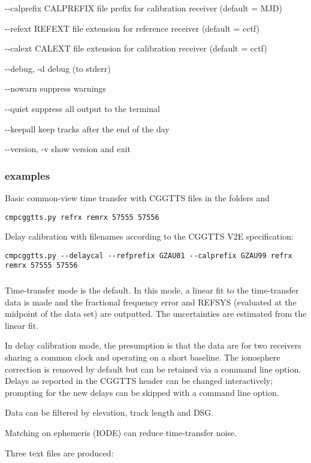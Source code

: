 \begin{description*}
  \item[-{}-calprefix CALPREFIX] file prefix for calibration receiver (default = MJD)
  \item[-{}-refext REFEXT]       file extension for reference receiver (default = cctf)
  \item[-{}-calext CALEXT]       file extension for calibration receiver (default = cctf)
  \item[-{}-debug, -d]           debug (to stderr)
  \item[-{}-nowarn]              suppress warnings
  \item[-{}-quiet]               suppress all output to the terminal
  \item[-{}-keepall]             keep tracks after the end of the day
  \item[-{}-version, -v]         show version and exit
\end{description*}

\subsubsection{examples}

Basic common-view time transfer with CGGTTS files in the folders  and 
\begin{lstlisting}[mathescape=true]
cmpcggtts.py refrx remrx 57555 57556
\end{lstlisting}

Delay calibration with filenames according to the CGGTTS V2E specification:
\begin{lstlisting}[mathescape=true]
cmpcggtts.py --delaycal --refprefix GZAU01 --calprefix GZAU99 refrx remrx 57555 57556
\end{lstlisting}

\subsubsection{}

Time-transfer mode is the default. In this mode, a linear fit to the time-transfer data is made and the 
fractional frequency error and REFSYS (evaluated at the midpoint of the data set) are outputted. 
The uncertainties are estimated from the linear fit.

In delay calibration mode, the presumption is that the data are for two receivers sharing a
common clock and operating on a short baseline. The ionosphere correction is removed by default
but can be retained via a command line option. Delays as reported in the CGGTTS header can be 
changed interactively; prompting for the new delays can be skipped with a command line option.


Data can be filtered by elevation, track length and DSG.

Matching on ephemeris (IODE) can reduce time-transfer noise.

Three text files are produced:




